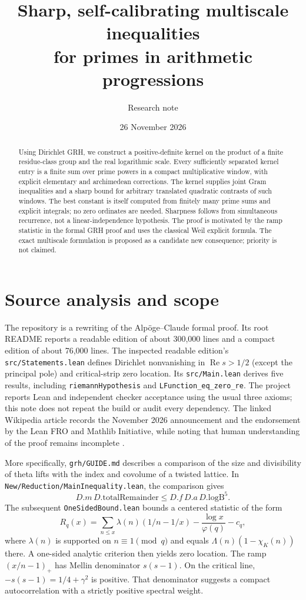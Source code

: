 \documentclass[11pt]{article}
\title{Sharp, self-calibrating multiscale inequalities\\ for primes in arithmetic progressions}
\author{Research note}
\date{26 November 2026}
\newcommand{\ph}{\varphi}
\DeclareMathOperator{\Ree}{Re}
\begin{document}
\maketitle
\begin{abstract}
Using Dirichlet GRH, we construct a positive-definite kernel on the product of a finite residue-class group and the real logarithmic scale. Every sufficiently separated kernel entry is a finite sum over prime powers in a compact multiplicative window, with explicit elementary and archimedean corrections. The kernel supplies joint Gram inequalities and a sharp bound for arbitrary translated quadratic contrasts of such windows. The best constant is itself computed from finitely many prime sums and explicit integrals; no zero ordinates are needed. Sharpness follows from simultaneous recurrence, not a linear-independence hypothesis. The proof is motivated by the ramp statistic in the formal GRH proof and uses the classical Weil explicit formula. The exact multiscale formulation is proposed as a candidate new consequence; priority is not claimed.
\end{abstract}

\section{Source analysis and scope}
The repository \cite{repo} is a rewriting of the Alp\"oge--Claude formal proof. Its root README reports a readable edition of about 300,000 lines and a compact edition of about 76,000 lines. The inspected readable edition's \texttt{src/Statements.lean} defines Dirichlet nonvanishing in $\Ree s>1/2$ (except the principal pole) and critical-strip zero location. Its \texttt{src/Main.lean} derives five results, including \texttt{riemannHypothesis} and \texttt{LFunction\_eq\_zero\_re}. The project reports Lean and independent checker acceptance using the usual three axioms; this note does not repeat the build or audit every dependency. The linked Wikipedia article records the November 2026 announcement and the endorsement by the Lean FRO and Mathlib Initiative, while noting that human understanding of the proof remains incomplete \cite{wiki}.

More specifically, \texttt{grh/GUIDE.md} describes a comparison of the size and divisibility of theta lifts with the index and covolume of a twisted lattice. In \texttt{New/Reduction/MainInequality.lean}, the comparison gives
\[
 D.m\,D.\mathrm{totalRemainder}\le D.f\,D.a\,D.\mathrm{logB}^{5}.
\]
The subsequent \texttt{OneSidedBound.lean} bounds a centered statistic of the form
\[
 R_q(x)=\sum_{n\le x}\lambda(n)(1/n-1/x)-\frac{\log x}{\ph(q)}-c_q,
\]
where $\lambda(n)$ is supported on $n\equiv1\pmod q$ and equals $\Lambda(n)(1-\chi_K(n))$ there. A one-sided analytic criterion then yields zero location. The ramp $ (x/n-1)_+$ has Mellin denominator $s(s-1)$. On the critical line, $-s(s-1)=1/4+\gamma^2$ is positive. That denominator suggests a compact autocorrelation with a strictly positive spectral weight.
\end{document}
